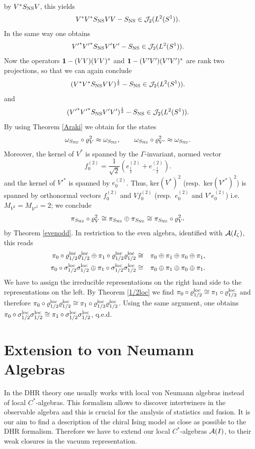 \documentclass[10pt,a4paper]{article}
\begin{document}
by $V^*S_{\rm NS}V$, this yields
\[ V^*V^*S_{\rm NS}VV-S_{\rm NS} \in
{\cal J}_2(L^2(S^1)). \]
In the same way one obtains
\[ {V'}^*{V'}^*S_{\rm NS}V'V'-S_{\rm NS} \in
{\cal J}_2(L^2(S^1)). \]
Now the operators ${\bf 1}-(VV)(VV)^*$ and
${\bf 1}-(V'V')(V'V')^*$ are  rank two projections,
so that we can again conclude
\[ (V^*V^*S_{\rm NS}VV)^\frac{1}{2}-S_{\rm NS} \in
{\cal J}_2(L^2(S^1)). \]
and
\[ ({V'}^*{V'}^*S_{\rm NS}V'V')^\frac{1}{2}-S_{\rm NS} \in
{\cal J}_2(L^2(S^1)). \]
By using Theorem \ref{Araki} we obtain for the states
\[ \omega_{S_{\rm NS}} \circ \varrho_V^2
\approx \omega_{S_{\rm NS}}, \qquad
\omega_{S_{\rm NS}} \circ \varrho_{V'}^2
\approx \omega_{S_{\rm NS}}. \]
Moreover, the kernel of $V^*$ is spanned by the
$\Gamma$-invariant, normed vector
\[ f_0^{(2)} = \frac{1}{\sqrt{2}}(e_\frac{1}{2}^{(2)}
+ e_{-\frac{1}{2}}^{(2)}).\]
and the kernel of ${V'}^*$ is spanned by $e_0^{(2)}$.
Thus, ker$(V^*)^2$ (resp.~ker$({V'}^*)^2$) is spanned
by orthonormal vectors $f_0^{(2)}$ and $Vf_0^{(2)}$
(resp.~$e_0^{(2)}$ and $V'e_0^{(2)}$)
i.e.~$M_{V^2}=M_{{V'}^2}=2$; we conclude
\[ \pi_{S_{\rm NS}}\circ\varrho_V^2 \cong \pi_{S_{\rm NS}}
\oplus \pi_{S_{\rm NS}} \cong \pi_{S_{\rm NS}}\circ\varrho_{V'}^2 \]
by Theorem \ref{evenodd}. In restriction to the even algebra,
identified with ${\cal A}(I_\zeta)$, this reads
\begin{eqnarray*}
\pi_0 \circ \varrho_{1/2}^{\rm loc}
\varrho_{1/2}^{\rm loc} \oplus
\pi_1 \circ \varrho_{1/2}^{\rm loc}
\varrho_{1/2}^{\rm loc} &\cong&
\pi_0 \oplus \pi_1 \oplus \pi_0 \oplus \pi_1 ,\\
\pi_0 \circ \sigma_{1/2}^{\rm loc}
\sigma_{1/2}^{\rm loc} \oplus
\pi_1 \circ \sigma_{1/2}^{\rm loc}
\sigma_{1/2}^{\rm loc} &\cong&
\pi_0 \oplus \pi_1 \oplus \pi_0 \oplus \pi_1.
\end{eqnarray*}
We have to assign the irreducible representations on
the right hand side to the representations on the
left. By Theorem \ref{1/2loc} we find
$\pi_0\circ\varrho_{1/2}^{\rm loc}\cong
\pi_1\circ\varrho_{1/2}^{\rm loc}$ and therefore
$\pi_0\circ\varrho_{1/2}^{\rm loc}\varrho_{1/2}^{\rm loc}
\cong\pi_1\circ\varrho_{1/2}^{\rm loc}
\varrho_{1/2}^{\rm loc}$. Using the same argument,
one obtains
$\pi_0\circ\sigma_{1/2}^{\rm loc}\sigma_{1/2}^{\rm loc}
\cong\pi_1\circ\sigma_{1/2}^{\rm loc}
\sigma_{1/2}^{\rm loc}$, q.e.d.

\section{Extension to von Neumann Algebras}
In the DHR theory one usually works with
local von Neumann algebras instead of local
$C^*$-algebras. This formalism allows to
discover intertwiners in the observable
algebra and this is crucial for the analysis
of statistics and fusion. It is our aim to find
a description of the chiral Ising model as
close as possible to the DHR formalism. Therefore
we have to extend our local $C^*$-algebras
${\cal A}(I)$,  to their weak closures in the
vacuum representation.
\end{document}
